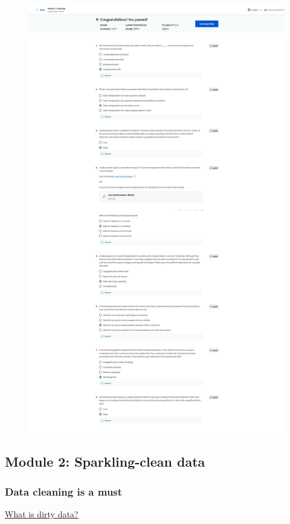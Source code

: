 \documentclass[]{article}
\begin{document}
\begin{figure}
  \centering
  \includegraphics[height=\textheight,keepaspectratio]{image/module_1.png}
\end{figure}

\pagebreak

\subsection{Module 2: Sparkling-clean data}
\subsubsection{Data cleaning is a must}
\uline{What is dirty data?} \par
\end{document}
